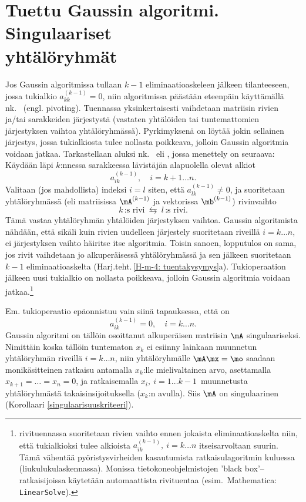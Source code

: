 \section[Tuettu Gaussin algoritmi. Singulaariset yhtälöryhmät]
{Tuettu Gaussin algoritmi. Singulaariset \\ yhtälöryhmät} 
\label{tuettu Gauss}
\alku
{}

Jos Gaussin algoritmissa tullaan $k-1$ eliminaatioaskeleen jälkeen tilanteeseen, jossa
tukialkio $a_{kk}^{(k-1)} = 0$, niin algoritmissa päästään eteenpäin käyttämällä nk.\
 (engl. pivoting). Tuennassa yksinkertaisesti vaihdetaan matriisin rivien
ja/tai sarakkeiden järjestystä (vastaten yhtälöiden tai tuntemattomien järjestyksen vaihtoa
yhtälöryhmässä).
Pyrkimyksenä on löytää jokin sellainen 
järjestys, jossa tukialkiosta tulee nollasta poikkeava, jolloin Gaussin algoritmia voidaan 
jatkaa. Tarkastellaan aluksi nk.\ \kor{osittaista} eli
%
, jossa menettely on
seuraava: Käydään läpi $k$:nnessa sarakkeessa lävistäjän alapuolella olevat alkiot
\[
a_{ik}^{(k-1)}, \quad i=k+1 \ldots n.
\]
Valitaan (jos mahdollista) indeksi $i=l$ siten, että $a_{lk}^{(k-1)} \neq 0$, ja suoritetaan
yhtälöryhmässä (eli matriisissa $\mA^{(k-1)}$ ja vektorissa $\mb^{(k-1)}$) rivinvaihto
\[
k\,\text{:s rivi} \ \leftrightarrows\ l\,\text{:s rivi}.
\]
Tämä vastaa yhtälöryhmän yhtälöiden järjestyksen vaihtoa. Gaussin algoritmista nähdään, että 
sikäli kuin rivien uudelleen järjestely suoritetaan riveillä $i = k \ldots n$, ei järjestyksen
vaihto häiritse itse algoritmia. Toisin sanoen, lopputulos on sama, jos rivit vaihdetaan jo 
alkuperäisessä yhtälöryhmässä ja sen jälkeen suoritetaan $k-1$ eliminaatioaskelta 
(Harj.teht.\,\ref{H-m-4: tuentakysymys}a). Tukioperaation jälkeen uusi tukialkio on nollasta
poikkeava, jolloin Gaussin algoritmia voidaan jatkaa.\footnote[2]{\kor{Automaattisessa}
rivituennassa suoritetaan rivien vaihto ennen jokaista eliminaatioaskelta niin, että
tukialkioksi tulee alkioista $a_{ik}^{(k-1)},\ i=k \ldots n$ itseisarvoltaan suurin. Tämä
vähentää pyöristysvirheiden kasautumista ratkaisulagoritmin kuluessa (liukulukulaskennassa).
Monissa tietokoneohjelmistojen 'black box'--ratkaisijoissa käytetään automaattista rivituentaa
(esim.\ Mathematica: {\tt LinearSolve}).}

Em. tukioperaatio epäonnistuu vain siinä tapauksessa, että on
\[
a_{ik}^{(k-1)} = 0, \quad i = k \ldots n.
\]
Gaussin algoritmi on tällöin osoittanut alkuperäisen matriisin $\mA$ singulaariseksi. Nimittäin
koska tällöin tuntematon $x_k$ ei esiinny lainkaan muunnetun yhtälöryhmän riveillä 
$i=k \ldots n$, niin yhtälöryhmälle $\mA \mx = \mo$ saadaan monikäsitteinen ratkaisu antamalla
$x_k$:lle mielivaltainen arvo, asettamalla $x_{k+1}=\ldots=x_n=0$, ja ratkaisemalla 
$x_i, \ i=1 \ldots k-1\,$ muunnetusta yhtälöryhmästä takaisinsijoituksella ($x_k$:n avulla). 
Siis $\mA$ on singulaarinen (Korollaari \ref{singulaarisuuskriteeri}).

